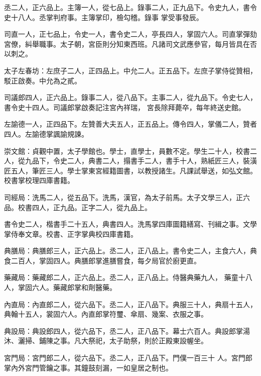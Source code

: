 \begin{pinyinscope}
 丞二人，正六品上。主簿一人，從七品上。錄事二人，正九品下。令史九人，書令史十八人。丞掌判府事。主簿掌印，檢勾稽。錄事
 掌受事發辰。



 司直一人，正七品上，令史一人，書令史二人，亭長四人，掌固六人。司直掌彈劾宮僚，糾舉職事。太子朝，宮臣則分知東西班。凡諸司文武應參官，每月皆具在否以刺之。



 太子左春坊：左庶子二人，正四品上。中允二人。正五品下。左庶子掌侍從贊相，駁正啟奏。中允為之貳。



 司議郎四人，正六品上。錄事二人，從八品下。主事二人，從九品下。令史七人，書令史十四人。司議郎掌啟奏記注宮內祥瑞，
 宮長除拜薨卒，每年終送史館。



 左諭德一人，正四品下。左贊善大夫五人，正五品上。傳令四人，掌儀二人，贊者四人。左諭德掌諷諭規諫。



 崇文館：貞觀中置，太子學館也。學士，直學士，員數不定。學生二十人，校書二人，從九品下，令史二人，典書二人，搨書手二人，書手十人，熟紙匠三人，裝潢匠五人，筆匠三人。學士掌東宮經籍圖書，以教授諸生。凡課試舉送，如弘文館。校書掌校理四庫書籍。



 司經局：洗馬二人，從五品下。洗馬，漢官，為太子前馬。太子文學三人，正六品。校書四人，正九品。正字二人，從九品上。



 書令史二人，楷書手二十五人，典書四人。洗馬掌四庫圖籍繕寫、刊緝之事。文學掌侍奉文章。校書、正字掌典校四庫書籍。



 典膳局：典膳郎三人，正六品上。丞二人，正八品上。書令史二人，主食六人，典食二百人，掌固四人。典膳郎掌進膳嘗食，每夕局官於廚更直。



 藥藏局：藥藏郎二人，正六品上。丞二人，正八品上。侍醫典藥九人，
 藥童十八人，掌固六人。藥藏郎掌和劑醫藥。



 內直局：內直郎二人，從六品下。丞二人，正八品下。典服三十人，典扇十五人，典翰十五人，裳固六人。內直郎掌符璽、傘扇、幾案、衣服之事。



 典設局：典設郎四人，從六品下，丞二人，正八品下。幕士六百人。典設郎掌湯沐、灑掃、鋪陳之事。凡大祭祀，太子助祭，則於正殿東設幄坐。



 宮門局：宮門郎二人，從六品下。丞二人，正八品下。門僕一百三十
 人。宮門郎掌內外宮門管鑰之事。其鐘鼓刻漏，一如皇居之制也。




\end{pinyinscope}
